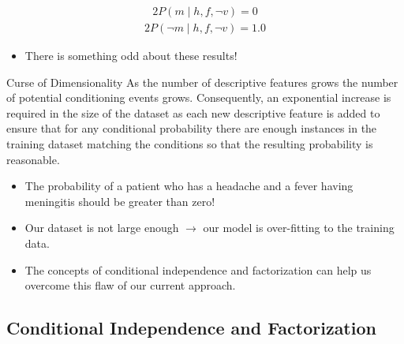 \documentclass[xcolor={table}]{beamer}
\begin{document}
\begin{frame}
\begin{alignat*}{2}
P(m \mid h, f, \lnot v)=0
\end{alignat*}
\begin{alignat*}{2}
P(\lnot m \mid h, f, \lnot v)=1.0
\end{alignat*}
\begin{itemize}
	\item There is something odd about these results!
\end{itemize}
\end{frame}
\begin{frame}
		\begin{alertblock}{Curse of Dimensionality}
		As the number of descriptive features grows the number of potential conditioning events grows. Consequently, an exponential increase is required in the size of the dataset as each new descriptive feature is added to ensure that for any conditional probability there are enough instances in the training dataset matching the conditions so that the resulting probability is reasonable. 
		\end{alertblock}
\end{frame}

\begin{frame}
	\begin{itemize}
		\item The probability of a patient who has a headache and a fever having meningitis should be greater than zero! 
		\item Our dataset is not large enough $\rightarrow$ our model is \alert{over-fitting} to the training data. 
		\item The concepts of \alert{conditional independence}  and \alert{factorization} can help us overcome this flaw of our current approach.
	\end{itemize}
\end{frame}
	


\subsection{Conditional Independence and Factorization}
\end{document}
